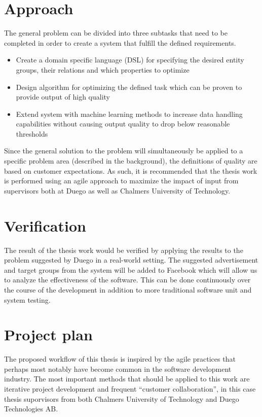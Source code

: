 \documentclass[a4paper]{article}
\begin{document}
\section{Approach}
\label{sec:approach}
The general problem can be divided into three subtasks that need to be completed in order to create a system that fulfill the defined requirements.
\begin{itemize}
	\item Create a domain specific language (DSL) for specifying the desired entity groups, their relations and which properties to optimize
	\item Design algorithm for optimizing the defined task which can be proven to provide output of high quality 
	\item Extend system with machine learning methods to increase data handling capabilities without causing output quality to drop below reasonable thresholds
\end{itemize}
Since the general solution to the problem will simultaneously be applied to a specific problem area (described in the background), the definitions of quality are based on customer expectations. As such, it is recommended that the thesis work is performed using an agile approach to maximize the impact of input from supervisors both at Duego as well as Chalmers University of Technology.

\section{Verification}
The result of the thesis work would be verified by applying the results to the problem suggested by Duego in a real-world setting. The suggested advertisement and target groups from the system will be added to Facebook which will allow us to analyze the effectiveness of the software. This can be done continuously over the course of the development in addition to more traditional software unit and system testing.

\section{Project plan}
The proposed workflow of this thesis is inspired by the agile practices that perhaps most notably have become 
common in the software development industry. The most important methods that should be applied to this work are
iterative project development and frequent ``customer collaboration'', in this case thesis suporvisors from both
Chalmers University of Technology and Duego Technologies AB.
\end{document}

